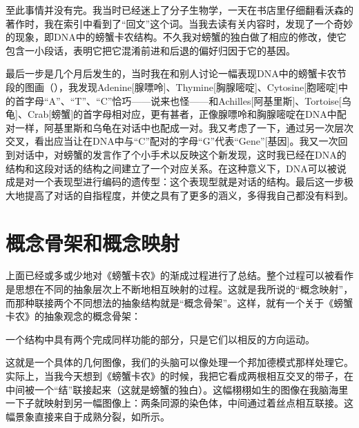 \begin{description}[wide,format=\em\itemcolon,labelsep=\ccwd]
至此事情并没有完。我当时已经迷上了分子生物学，一天在书店里仔细翻看沃森的著作时，我在索引中看到了“回文”这个词。当我去读有关内容时，发现了一个奇妙的现象，即DNA中的螃蟹卡农结构。不久我对螃蟹的独白做了相应的修改，使它包含一小段话，表明它把它混淆前进和后退的偏好归因于它的基因。

\item[末期]最后一步是几个月后发生的，当时我在和别人讨论一幅表现DNA中的螃蟹卡农节段的图画（），我发现Adenine[腺嘌呤]、Thymine[胸腺嘧啶]、Cytosine[胞嘧啶]中的首字母“A”、“T”、“C”恰巧——说来也怪——和Achilles[阿基里斯]、Tortoise[乌龟]、Crab[螃蟹]的首字母相对应，更有甚者，正像腺嘌呤和胸腺嘧啶在DNA中配对一样，阿基里斯和乌龟在对话中也配成一对。我又考虑了一下，通过另一次层次交叉，看出应当让在DNA中与“C”配对的字母“G”代表“Gene”[基因]。我又一次回到对话中，对螃蟹的发言作了个小手术以反映这个新发现，这时我已经在DNA的结构和这段对话的结构之间建立了一个对应关系。在这种意义下，DNA可以被说成是对一个表现型进行编码的遗传型：这个表现型就是对话的结构。最后这一步极大地提高了对话的自指程度，并使之具有了更多的涵义，多得我自己都没有料到。

\end{description}

\section{概念骨架和概念映射}

上面已经或多或少地对《螃蟹卡农》的渐成过程进行了总结。整个过程可以被看作是思想在不同的抽象层次上不断地相互映射的过程。这就是我所说的“概念映射”，而那种联接两个不同想法的抽象结构就是“概念骨架”。这样，就有一个关于《螃蟹卡农》的抽象观念的概念骨架：

\begin{block}
一个结构中具有两个完成同样功能的部分，只是它们以相反的方向运动。
\end{block}

这就是一个具体的几何图像，我们的头脑可以像处理一个邦加德模式那样处理它。实际上，当我今天想到《螃蟹卡农》的时候，我把它看成两根相互交叉的带子，在中间被一个“结”联接起来（这就是螃蟹的独白）。这幅栩栩如生的图像在我脑海里一下子就映射到另一幅图像上：两条同源的染色体，中间通过着丝点相互联接。这幅景象直接来自于成熟分裂，如所示。

